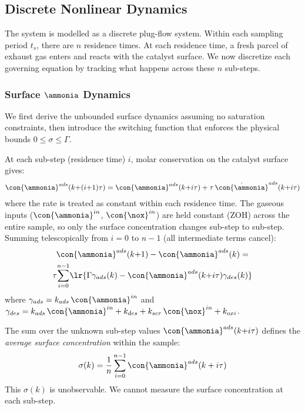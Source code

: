 \subsection{Discrete Nonlinear Dynamics}

The system is modelled as a discrete plug-flow system. Within each sampling period $t_s$, there are $n$ residence
times. At each residence time, a fresh parcel of exhaust gas enters and reacts with the catalyst surface. We now
discretize each governing equation by tracking what happens across these $n$ sub-steps.

\subsubsection{Surface $\ammonia$ Dynamics}
We first derive the unbounded surface dynamics assuming no saturation constraints, then introduce the switching function
that enforces the physical bounds $0 \leq \sigma \leq \Gamma$.

At each sub-step (residence time) $i$, molar conservation on the catalyst surface gives:
\begin{align}
    \con{\ammonia}^{ads}(k{+}(i{+}1)\tau) = \con{\ammonia}^{ads}(k{+}i\tau)
        + \tau\,\dot{\con{\ammonia}}^{ads}(k{+}i\tau)
\end{align}
where the rate is treated as constant within each residence time. The gaseous inputs
($\con{\ammonia}^{in}$, $\con{\nox}^{in}$) are held constant (ZOH) across the entire sample, so only the surface
concentration changes sub-step to sub-step. Summing telescopically from $i = 0$ to $n{-}1$ (all intermediate terms
cancel):
\begin{multline}
    \con{\ammonia}^{ads}(k{+}1) - \con{\ammonia}^{ads}(k) = \\
    \tau \!\sum_{i=0}^{n-1}\! \lr{\Gamma\gamma_{ads}(k) - \con{\ammonia}^{ads}(k{+}i\tau)\gamma_{des}(k)}
\end{multline}
where $\gamma_{ads} = k_{ads}\,\con{\ammonia}^{in}$ and
$\gamma_{des} = k_{ads}\,\con{\ammonia}^{in} + k_{des} + k_{scr}\,\con{\nox}^{in} + k_{oxi}$.

The sum over the unknown sub-step values $\con{\ammonia}^{ads}(k{+}i\tau)$ defines the \textit{average surface
concentration} within the sample:
\begin{align}
    \sigma(k) = \frac{1}{n}\sum_{i=0}^{n-1}\con{\ammonia}^{ads}(k + i\tau)
\end{align}
This $\sigma(k)$ is unobservable. We cannot measure the surface concentration at each sub-step.

